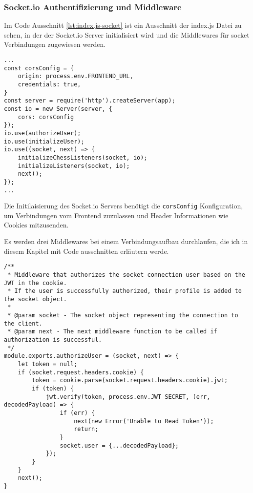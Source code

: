 \subsubsection{Socket.io Authentifizierung und Middleware}
\label{sec:Backend-Socket}
Im Code Ausschnitt \ref{lst:index.js-socket} ist ein Ausschnitt der index.js Datei zu sehen, in der der Socket.io Server initialisiert wird und die Middlewares für socket Verbindungen zugewiesen werden.

\begin{lstlisting}[style=codeStyle, caption={Ausschnitt der index.js Datei mit Socket.io Server Erstellung und Middleware Zuweisung}, label={lst:index.js-socket}]
...
const corsConfig = {
    origin: process.env.FRONTEND_URL,
    credentials: true,
}
const server = require('http').createServer(app);
const io = new Server(server, {
    cors: corsConfig
});
io.use(authorizeUser);
io.use(initializeUser);
io.use((socket, next) => {
    initializeChessListeners(socket, io);
    initializeListeners(socket, io);
    next();
});
...
\end{lstlisting}

Die Initilaisierung des Socket.io Servers benötigt die \verb|corsConfig| Konfiguration, um Verbindungen vom Frontend zuzulassen und Header Informationen wie Cookies mitzusenden.

Es werden drei Middlewares bei einem Verbindungsaufbau durchlaufen,  die ich in diesem Kapitel mit Code ausschnitten erläutern werde.


\begin{lstlisting}[style=codeStyle, caption={authorizeUser Middleware für Socket.io Verbinudngen}, label={lst:authorizeUser}]
/**
 * Middleware that authorizes the socket connection user based on the JWT in the cookie.
 * If the user is successfully authorized, their profile is added to the socket object.
 *
 * @param socket - The socket object representing the connection to the client.
 * @param next - The next middleware function to be called if authorization is successful.
 */
module.exports.authorizeUser = (socket, next) => {
    let token = null;
    if (socket.request.headers.cookie) {
        token = cookie.parse(socket.request.headers.cookie).jwt;
        if (token) {
            jwt.verify(token, process.env.JWT_SECRET, (err, decodedPayload) => {
                if (err) {
                    next(new Error('Unable to Read Token'));
                    return;
                }
                socket.user = {...decodedPayload};
            });
        }
    }
    next();
}
\end{lstlisting}

